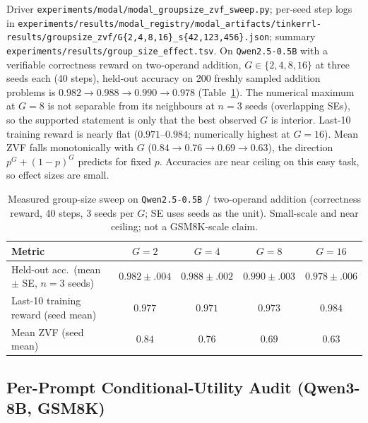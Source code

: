 Driver \texttt{experiments/\allowbreak{}modal/\allowbreak{}modal\_groupsize\_zvf\_sweep.py}; per-seed
step logs in
\texttt{experiments/\allowbreak{}results/\allowbreak{}modal\_registry/\allowbreak{}modal\_artifacts/\allowbreak{}tinkerrl-results/\allowbreak{}groupsize\_zvf/\allowbreak{}G\{2,4,8,16\}\_s\{42,123,456\}.json};
summary \texttt{experiments/\allowbreak{}results/\allowbreak{}group\_size\_effect.tsv}. On
\texttt{Qwen2.5-0.5B} with a verifiable correctness reward on two-operand
addition, $G\in\{2,4,8,16\}$ at three seeds each (40 steps), held-out
accuracy on 200 freshly sampled addition problems is
$0.982\to0.988\to0.990\to0.978$ (Table~\ref{tab:groupsize-measured}). The
numerical maximum at $G{=}8$ is not separable from its neighbours at $n{=}3$
seeds (overlapping SEs), so the supported statement is only that the
best observed $G$ is interior. Last-10 training reward is nearly flat
($0.971$--$0.984$; numerically highest at $G{=}16$). Mean ZVF falls
monotonically with $G$ ($0.84\to0.76\to0.69\to0.63$), the direction
$p^{G}+(1-p)^{G}$ predicts for fixed $p$. Accuracies are near ceiling on
this easy task, so effect sizes are small.

\begin{table}[ht]
\centering
\small
\begin{tabular}{lcccc}
\toprule
Metric & $G{=}2$ & $G{=}4$ & $G{=}8$ & $G{=}16$ \\
\midrule
Held-out acc.\ (mean $\pm$ SE, $n{=}3$ seeds) & $0.982{\pm}.004$ & $0.988{\pm}.002$ & $0.990{\pm}.003$ & $0.978{\pm}.006$ \\
Last-10 training reward (seed mean) & $0.977$ & $0.971$ & $0.973$ & $0.984$ \\
Mean ZVF (seed mean) & $0.84$ & $0.76$ & $0.69$ & $0.63$ \\
\bottomrule
\end{tabular}
\caption{Measured group-size sweep on \texttt{Qwen2.5-0.5B} / two-operand
addition (correctness reward, 40 steps, 3 seeds per $G$; SE uses seeds as
the unit). Small-scale and near ceiling; not a GSM8K-scale claim.}
\label{tab:groupsize-measured}
\end{table}

\subsection{Per-Prompt Conditional-Utility Audit (Qwen3-8B, GSM8K)}

